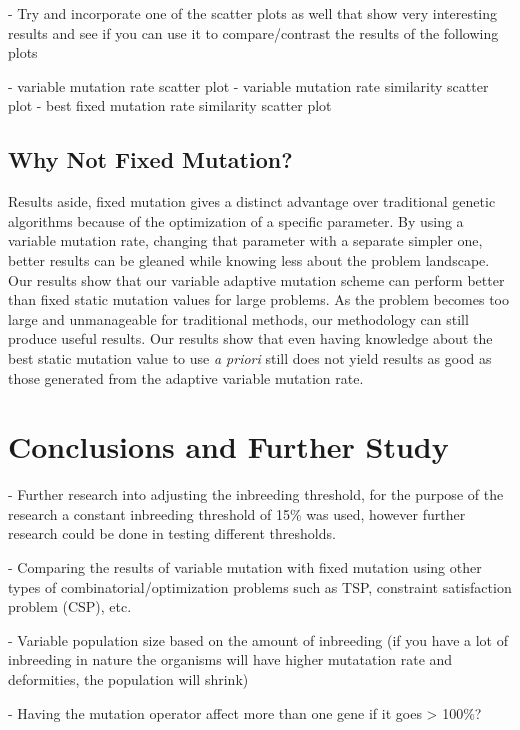 \documentclass{sig-alternate}
\begin{document}
- Try and incorporate one of the scatter plots as well that show very interesting
  results and see if you can use it to compare/contrast the results of the 
  following plots
  
    - variable mutation rate scatter plot
    - variable mutation rate similarity scatter plot
    - best fixed mutation rate similarity scatter plot

\subsection{Why Not Fixed Mutation?}
Results aside, fixed mutation gives a distinct advantage over traditional genetic algorithms because of the optimization of a specific parameter. By using a variable mutation rate, changing that parameter with a separate simpler one, better results can be gleaned while knowing less about the problem landscape. Our results show that our variable adaptive mutation scheme can perform better than fixed static mutation values for large problems. As the problem becomes too large and unmanageable for traditional methods, our methodology can still produce useful results. Our results show that even having knowledge about the best static mutation value to use \emph{a priori} still does not yield results as good as those generated from the adaptive variable mutation rate.


% 
%
\section{Conclusions and Further Study}

- Further research into adjusting the inbreeding threshold, for the purpose
  of the research a constant inbreeding threshold of 15\% was used, however
  further research could be done in testing different thresholds.

- Comparing the results of variable mutation with fixed mutation using other
  types of combinatorial/optimization problems such as TSP, constraint
  satisfaction problem (CSP), etc.

- Variable population size based on the amount of inbreeding (if you have
  a lot of inbreeding in nature the organisms will have higher mutatation
  rate and deformities, the population will shrink)

- Having the mutation operator affect more than one gene if it goes > 100\%? 
\end{document}
